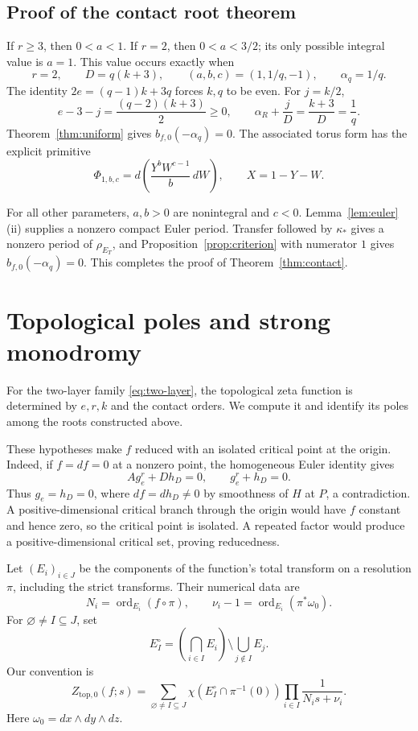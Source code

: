 \documentclass[11pt]{article}
\numberwithin{equation}{section}
\theoremstyle{definition}
\theoremstyle{remark}
\newcommand{\omegao}{\omega_0}
\newcommand{\bfzero}{b_{f,0}}
\DeclareMathOperator{\ord}{ord}
\begin{document}
\subsection{Proof of the contact root theorem}

If $r\ge3$, then $0<a<1$. If $r=2$, then $0<a<3/2$;
its only possible integral value is $a=1$.
This value occurs exactly when
\begin{equation}\label{eq:integer-resonance}
 r=2,\qquad D=q(k+3),\qquad
 (a,b,c)=(1,1/q,-1),\qquad \alpha_q=1/q.
\end{equation}
The identity $2e=(q-1)k+3q$ forces $k,q$ to be even.
For $j=k/2$,
\[
 e-3-j=\frac{(q-2)(k+3)}2\ge0,\qquad
 \alpha_R+\frac jD=\frac{k+3}{D}=\frac1q.
\]
Theorem~\ref{thm:uniform} gives $\bfzero(-\alpha_q)=0$.
The associated torus form has the explicit primitive
\begin{equation}\label{eq:exact-contact-form}
 \Phi_{1,b,c}=d\left(\frac{Y^bW^{c-1}}b\,dW\right),
 \qquad X=1-Y-W.
\end{equation}

For all other parameters, $a,b>0$ are nonintegral and
$c<0$. Lemma~\ref{lem:euler}(ii) supplies a nonzero
compact Euler period. Transfer followed by $\kappa_*$
gives a nonzero period of $\rho_{E_T}$, and
Proposition~\ref{prop:criterion} with numerator $1$
gives $\bfzero(-\alpha_q)=0$.
This completes the proof of Theorem~\ref{thm:contact}.

\section{Topological poles and strong monodromy}\label{sec:poles}

For the two-layer family \eqref{eq:two-layer}, the
topological zeta function is determined by $e,r,k$ and
the contact orders. We compute it and identify its poles
among the roots constructed above.

These hypotheses make $f$ reduced with an isolated
critical point at the origin. Indeed, if $f=df=0$ at a
nonzero point, the homogeneous Euler identity gives
\[
 Ag_e^r+Dh_D=0,\qquad g_e^r+h_D=0.
\]
Thus $g_e=h_D=0$, where $df=dh_D\ne0$ by smoothness of
$H$ at $P$, a contradiction. A positive-dimensional
critical branch through the origin would have $f$
constant and hence zero, so the critical point is isolated.
A repeated factor would produce a positive-dimensional
critical set, proving reducedness.

Let $(E_i)_{i\in J}$ be the components of the function's
total transform on a resolution $\pi$, including the strict
transforms. Their numerical data are
\[
 N_i=\ord_{E_i}(f\circ\pi),\qquad
 \nu_i-1=\ord_{E_i}(\pi^*\omegao).
\]
For $\varnothing\ne I\subseteq J$, set
\[
 E_I^\circ=\left(\bigcap_{i\in I}E_i\right)
                       \setminus\bigcup_{j\notin I}E_j.
\]
Our convention is
\begin{equation}\label{eq:zeta-definition}
 Z_{\mathrm{top},0}(f;s)=
 \sum_{\varnothing\ne I\subseteq J}
 \chi(E_I^\circ\cap\pi^{-1}(0))
                    \prod_{i\in I}\frac1{N_is+\nu_i}.
\end{equation}
Here $\omegao=dx\wedge dy\wedge dz$.
\end{document}
